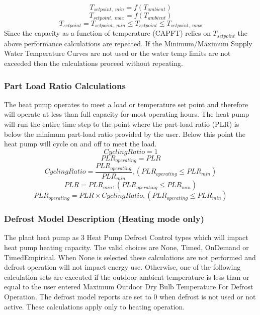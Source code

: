 \begin{equation}
T_{setpoint,\;min} = f(T_{ambient})
\end{equation}
\begin{equation}
T_{setpoint,\;max} = f(T_{ambient})
\end{equation}
\begin{equation}
T_{setpoint} = T_{setpoint,\;min} \le T_{setpoint} \le T_{setpoint,\;max}
\end{equation}
Since the capacity as a function of temperature (CAPFT) relies on $T_{setpoint}$ the above performance calculations are repeated. If the Minimum/Maximum Supply Water Temperature Curves are not used or the water temp limits are not exceeded then the calculations proceed without repeating.

\subsubsection{Part Load Ratio Calculations}\label{eir-air-to-water-heat-pumps-part-load-ratio-calculations}
The heat pump operates to meet a load or temperature set point and therefore will operate at less than full capacity for most operating hours. The heat pump will run the entire time step to the point where the part-load ratio (PLR) is below the minimum part-load ratio provided by the user. Below this point the heat pump will cycle on and off to meet the load.
\begin{equation}
CyclingRatio = 1
\end{equation}
\begin{equation}
PLR_{operating} = PLR
\end{equation}
\begin{equation}
CyclingRatio = \frac{PLR_{operating}}{PLR_{min}}, {(PLR_{operating}\le PLR_{min})}
\end{equation}
\begin{equation}
PLR = PLR_{min}, {(PLR_{operating}\le PLR_{min})}
\end{equation}
\begin{equation}
PLR_{operating} = PLR \times CyclingRatio, {(PLR_{operating}\le PLR_{min})}
\end{equation}


\subsubsection{Defrost Model Description (Heating mode only)}\label{eir-air-to-water-heat-pumps-defrost-model-description}
The plant heat pump as 3 Heat Pump Defrost Control types which will impact heat pump heating capacity. The valid choices are None, Timed, OnDemand or TimedEmpirical. When None is selected these calculations are not performed and defrost operation will not impact energy use. Otherwise, one of the following calculation sets are executed if the outdoor ambient temperature is less than or equal to the user entered Maximum Outdoor Dry Bulb Temperature For Defrost Operation. The defrost model reports are set to 0 when defrost is not used or not active. These calculations apply only to heating operation.


